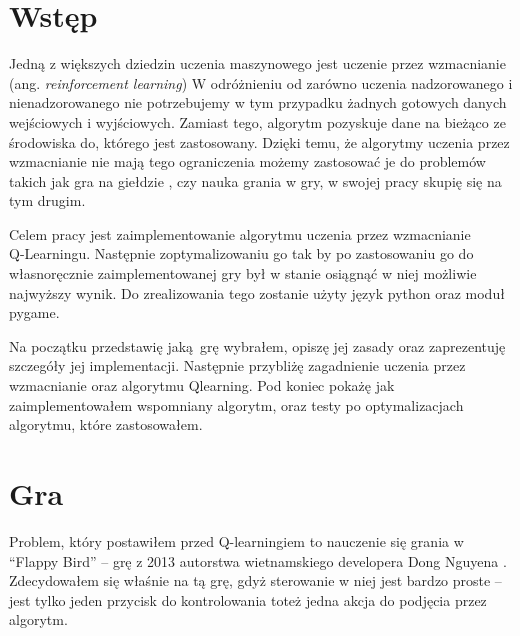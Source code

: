 \documentclass[a4paper, 12pt,oneside]{book}
\newcommand\chap[1]{%
  \chapter*{#1}%
  \addcontentsline{toc}{chapter}{#1}}
\begin{document}
\sloppy
\thispagestyle{empty}

\newpage{}

\thispagestyle{empty}
\newpage{}

\tableofcontents{}
\newpage


\chap{Wstęp}
Jedną z większych dziedzin uczenia maszynowego jest uczenie przez wzmacnianie 
(ang. \textit{reinforcement learning}) W odróżnieniu od zarówno uczenia 
nadzorowanego i nienadzorowanego nie potrzebujemy w tym przypadku żadnych
gotowych danych wejściowych i wyjściowych. Zamiast tego, algorytm pozyskuje
dane na bieżąco ze środowiska do, którego jest zastosowany. Dzięki temu,
że algorytmy uczenia przez wzmacnianie nie mają tego ograniczenia możemy
zastosować je do problemów takich jak gra na giełdzie
\cite{trading_reinforcement}, czy nauka grania w gry, w swojej pracy
skupię się na tym drugim.

Celem pracy jest zaimplementowanie algorytmu uczenia przez wzmacnianie\\
Q-Learningu. Następnie zoptymalizowaniu go tak by po zastosowaniu go do
własnoręcznie zaimplementowanej gry był w stanie osiągnąć w niej możliwie
najwyższy wynik. Do zrealizowania tego zostanie użyty język python oraz moduł
pygame.

Na początku przedstawię jaką grę wybrałem, opiszę jej zasady oraz zaprezentuję
szczegóły jej implementacji. Następnie  przybliżę zagadnienie uczenia przez
wzmacnianie oraz algorytmu Q\dywiz learning. Pod koniec pokażę jak
zaimplementowałem wspomniany algorytm, oraz testy po optymalizacjach algorytmu,
które zastosowałem.
\newpage{}

\chapter{Gra}
Problem, który postawiłem przed Q-learningiem to nauczenie się grania w
``Flappy Bird'' -- grę z 2013 autorstwa wietnamskiego developera Dong Nguyena
\cite{flappy_bird_author}. Zdecydowałem się właśnie na tą grę,
gdyż sterowanie w niej jest bardzo proste -- jest tylko jeden przycisk do
kontrolowania toteż jedna akcja do podjęcia przez algorytm.
\end{document}
